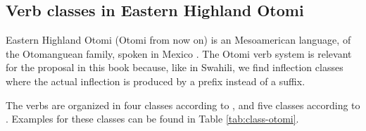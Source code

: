 
\subsection{Verb classes in Eastern Highland Otomi}

Eastern Highland Otomi (Otomi from now on) is an Mesoamerican language, of the Otoman\-guean family, spoken in Mexico \autocite{Echegoyen.1979}. The Otomi verb system is relevant for the proposal in this book because, like in Swahili, we find inflection classes where the actual inflection is produced by a prefix instead of a suffix.

The verbs are organized in four classes according to \textcite{Echegoyen.1979}, and five classes according to \textcite{Feist.2015}. Examples for these classes can be found in Table \ref{tab:class-otomi}.

